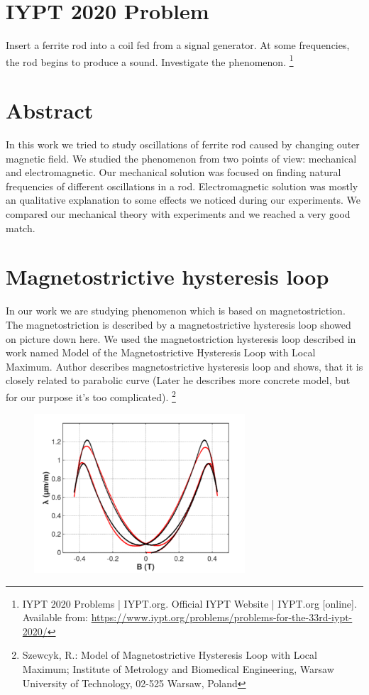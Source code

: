 \documentclass[10pt,a4paper]{article}
\begin{document}
\newpage

\section{IYPT 2020 Problem}
Insert a ferrite rod into a coil fed from a signal generator. At some frequencies, the rod begins to produce a sound. Investigate the phenomenon. \footnote{IYPT 2020 Problems | IYPT.org. Official IYPT Website | IYPT.org [online]. Available from: \url{https://www.iypt.org/problems/problems-for-the-33rd-iypt-2020/}}
\section{Abstract}
In this work we tried to study oscillations of ferrite rod caused by changing outer magnetic field. We studied the phenomenon from two points of view: mechanical and electromagnetic. Our mechanical solution was focused on finding natural frequencies of different oscillations in a rod. Electromagnetic solution was mostly an qualitative explanation to some effects we noticed during our experiments. We compared our mechanical theory with experiments and we reached a very good match.
\section{Magnetostrictive hysteresis loop}
In our work we are studying phenomenon which is based on magnetostriction. The magnetostriction is described by a magnetostrictive hysteresis loop showed on picture down here. We used the magnetostriction hysteresis loop described in work named Model of the Magnetostrictive Hysteresis Loop with Local Maximum. Author describes magnetostrictive hysteresis loop and shows, that it is closely related to parabolic curve (Later he describes more concrete model, but for our purpose it’s too complicated).
\footnote{Szewcyk, R.: Model of Magnetostrictive Hysteresis Loop with Local Maximum; Institute of Metrology and Biomedical Engineering, Warsaw University of Technology, 02-525 Warsaw, Poland}


\begin{figure}[H]
\centering
    \includegraphics[width=0.7\textwidth]{Magnet.png}
    \label{fig:chart1}
\end{figure}
\end{document}
